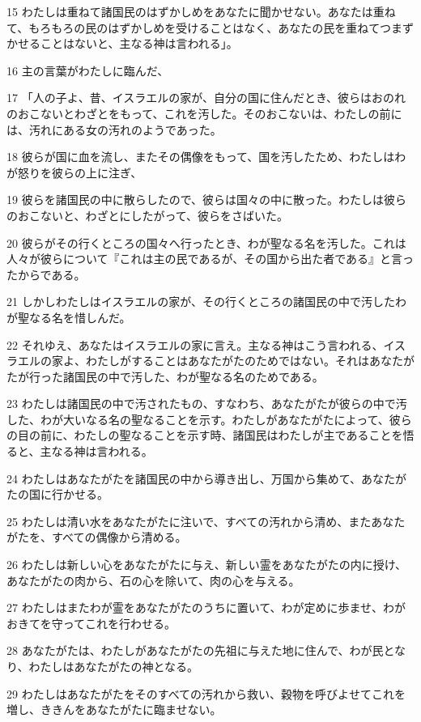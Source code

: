 \par 15 わたしは重ねて諸国民のはずかしめをあなたに聞かせない。あなたは重ねて、もろもろの民のはずかしめを受けることはなく、あなたの民を重ねてつまずかせることはないと、主なる神は言われる」。
\par 16 主の言葉がわたしに臨んだ、
\par 17 「人の子よ、昔、イスラエルの家が、自分の国に住んだとき、彼らはおのれのおこないとわざとをもって、これを汚した。そのおこないは、わたしの前には、汚れにある女の汚れのようであった。
\par 18 彼らが国に血を流し、またその偶像をもって、国を汚したため、わたしはわが怒りを彼らの上に注ぎ、
\par 19 彼らを諸国民の中に散らしたので、彼らは国々の中に散った。わたしは彼らのおこないと、わざとにしたがって、彼らをさばいた。
\par 20 彼らがその行くところの国々へ行ったとき、わが聖なる名を汚した。これは人々が彼らについて『これは主の民であるが、その国から出た者である』と言ったからである。
\par 21 しかしわたしはイスラエルの家が、その行くところの諸国民の中で汚したわが聖なる名を惜しんだ。
\par 22 それゆえ、あなたはイスラエルの家に言え。主なる神はこう言われる、イスラエルの家よ、わたしがすることはあなたがたのためではない。それはあなたがたが行った諸国民の中で汚した、わが聖なる名のためである。
\par 23 わたしは諸国民の中で汚されたもの、すなわち、あなたがたが彼らの中で汚した、わが大いなる名の聖なることを示す。わたしがあなたがたによって、彼らの目の前に、わたしの聖なることを示す時、諸国民はわたしが主であることを悟ると、主なる神は言われる。
\par 24 わたしはあなたがたを諸国民の中から導き出し、万国から集めて、あなたがたの国に行かせる。
\par 25 わたしは清い水をあなたがたに注いで、すべての汚れから清め、またあなたがたを、すべての偶像から清める。
\par 26 わたしは新しい心をあなたがたに与え、新しい霊をあなたがたの内に授け、あなたがたの肉から、石の心を除いて、肉の心を与える。
\par 27 わたしはまたわが霊をあなたがたのうちに置いて、わが定めに歩ませ、わがおきてを守ってこれを行わせる。
\par 28 あなたがたは、わたしがあなたがたの先祖に与えた地に住んで、わが民となり、わたしはあなたがたの神となる。
\par 29 わたしはあなたがたをそのすべての汚れから救い、穀物を呼びよせてこれを増し、ききんをあなたがたに臨ませない。
